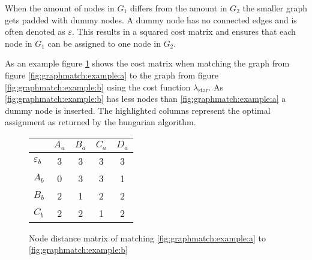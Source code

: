 \documentclass[
    12pt,                               %
    DIV=14,                     %
    parskip=half+,              %
    bigheadings,                %
    cleardoubleempty,   %
    halfparskip,                %
    ]{scrreprt} %
\begin{document}
When the amount of nodes in $G_1$ differs from the amount in $G_2$ the smaller graph gets padded with dummy nodes. A dummy node has no connected edges and is often denoted as $\varepsilon$. This results in a squared cost matrix and ensures that each node in $G_1$ can be assigned to one node in $G_2$.

As an example figure \ref{fig:graphmatch:distance} shows the cost matrix when matching the graph from figure \ref{fig:graphmatch:example:a} to the graph from figure \ref{fig:graphmatch:example:b} using the cost function $\lambda_{\text{star}}$. As \ref{fig:graphmatch:example:b} has less nodes than \ref{fig:graphmatch:example:a} a dummy node is inserted. The highlighted columns represent the optimal assignment as returned by the hungarian algorithm.

\begin{figure}[H]
	\centering
	\begin{tabular}{| l | c | c | c | c |}
		\hline
						& $A_a$ & $B_a$ & $C_a$ & $D_a$ \\
		\hline
		$\varepsilon_b$	& 3 & 3 & 3 & \cellcolor{orange}3 \\
		\hline
		$A_b$			& \cellcolor{orange}0 & 3 & 3 & 1 \\
		\hline
		$B_b$			& 2 & \cellcolor{orange}1 & 2 & 2 \\
		\hline
		$C_b$			& 2 & 2 & \cellcolor{orange}1 & 2 \\
		\hline
	\end{tabular}
	\caption{Node distance matrix of matching \ref{fig:graphmatch:example:a} to \ref{fig:graphmatch:example:b}}
	\label{fig:graphmatch:distance}
\end{figure}

\end{document}
